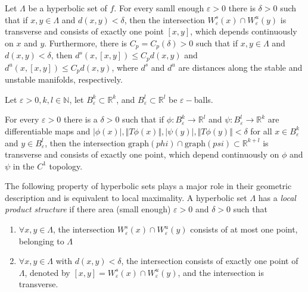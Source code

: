 \begin{prop}

Let $\Lambda$ be a hyperbolic set of $f$. For every samll enough $\varepsilon >0$ there is $\delta >0$ such that if $x,y \in \Lambda$ and $d(x,y)< \delta$, then the intersection $W^s_{\varepsilon}(x) \cap W^u_{\varepsilon}(y)$ is transverse and consists of exactly one point $[x,y]$, which depends continuously on $x$ and $y$. Furthermore, there is $C_p = C_p(\delta)>0$ such that if $x,y \in \Lambda$ and $d(x,y) < \delta$, then $d^s(x,[x,y]) \leq C_p d(x,y)$ and $d^u(x,[x,y]) \leq C_p d(x,y)$, where $d^s$ and $d^u$ are distances along the stable and unstable manifolds, respectively.

\end{prop}

Let $\varepsilon > 0, k,l \in \mathbb{N}$, let $B^k_{\varepsilon} \subset \mathbb{R}^k$, and $B^l_{\varepsilon} \subset \mathbb{R}^l$ be $\varepsilon-$balls.

\begin{lem}

For every $\varepsilon > 0$ there is a $\delta > 0$ such that if $\phi: B^k_{\varepsilon} \to \mathbb{R}^l$ and $\psi: B^l_{\varepsilon} \to \mathbb{R}^k$ are differentiable maps and $\vert \phi (x) \vert, \Vert T\phi(x) \Vert, \vert \psi (y) \vert, \Vert T\phi(y) \Vert < \delta$ for all $x \in B^k_{\varepsilon}$ and $y \in B^l_{\varepsilon}$, then the intersection $\mathrm{graph}(phi) \cap \mathrm{graph}(psi) \subset \mathbb{R}^{k+l}$ is transverse and consists of exactly one point, which depend continuously on $\phi$ and $\psi$ in the $C^1$ topology.

\end{lem}

\indent The following property of hyperbolic sets plays a major role in their geometric description and is equivalent to local maximality. A hyperbolic set $\Lambda$ has a \textit{local product structure} if there area (small enough) $\varepsilon > 0$ and $\delta > 0$ such that 
\begin{enumerate}
    \item $\forall x,y \in \Lambda$, the intersection $W^s_{\varepsilon}(x) \cap W^u_{\varepsilon}(y)$ consists of at most one point, belonging to $\Lambda$
    \item $\forall x,y \in \Lambda$ with $d(x,y)< \delta$, the intersection consists of exactly one point of $\Lambda$, denoted by $[x,y]=W^s_{\varepsilon}(x) \cap W^u_{\varepsilon}(y)$, and the intersection is transverse. 
\end{enumerate}

